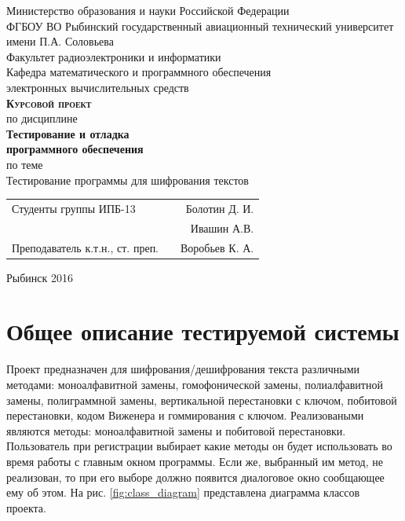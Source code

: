 \documentclass[a4paper,12pt]{article}
\begin{document}
\begin{titlepage}
\newpage


\begin{center}
	\large		
   	Министерство образования и науки Российской Федерации\\[0.5cm]
    	
	ФГБОУ ВО Рыбинский государственный авиационный технический университет имени П.А. Соловьева\\[1.0cm]

	Факультет радиоэлектроники и информатики\\[0.25cm]
		
	Кафедра математического и программного обеспечения\\ электронных вычислительных средств\\[1.5cm]
	
	\Large
	\textbf{\textsc{Курсовой проект}}\\[0.25cm]
	по  дисциплине\\
	\textbf{Тестирование и отладка\\ программного обеспечения}\\[0.5cm]
	
	по теме\\
	Тестирование программы для шифрования текстов
	
\end{center}

\vfill	
\begin{tabularx}{0.95\textwidth}{lXr}
Студенты группы ИПБ-13 			& &	Болотин Д. И.\\
								& &	Ивашин А.В. \\
Преподаватель к.т.н., ст. преп.	& & Воробьев К. А.\\
\end{tabularx}

\vspace{1.5cm}
\center Рыбинск 2016
\end{titlepage}	


\newpage
\setcounter{page}{2}

\tableofcontents

\newpage\section{Общее описание тестируемой системы}

Проект предназначен для шифрования/дешифрования текста различными методами: моноалфавитной замены, гомофонической замены, полиалфавитной замены, полиграммной замены, вертикальной перестановки с ключом,  побитовой перестановки, кодом Виженера и гоммирования с ключом. Реализоваными являются методы: моноалфавитной замены и побитовой перестановки.
Пользователь при регистрации выбирает какие методы он будет использовать во время работы с главным окном программы. Если же, выбранный им метод, не реализован, то при его выборе должно появится диалоговое окно сообщающее ему об этом.
На рис. \ref{fig:class_diagram} представлена  диаграмма классов проекта.
\end{document}
